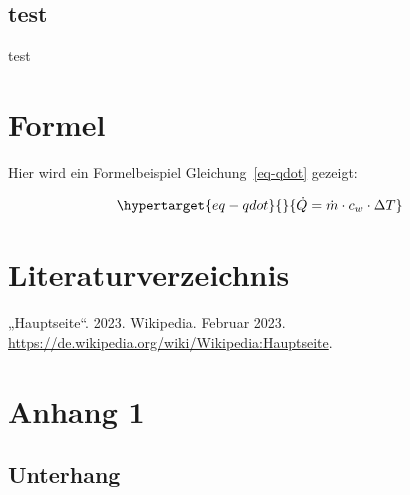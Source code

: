 \documentclass[
  11pt,
]{scrbook}
\newlength{\cslhangindent}
\newlength{\cslentryspacingunit} %
\newenvironment{CSLReferences}[2] %
 {%
  \setlength{\parindent}{0pt}
  \ifodd #1
  \let\oldpar\par
  \def\par{\hangindent=\cslhangindent\oldpar}
  \fi
  \setlength{\parskip}{#2\cslentryspacingunit}
 }%
 {}
\begin{document}
\hypertarget{test}{%
\section{test}\label{test}}

test

\hypertarget{formel}{%
\chapter{Formel}\label{formel}}

Hier wird ein Formelbeispiel Gleichung~\ref{eq-qdot} gezeigt:

\begin{equation}\protect\hypertarget{eq-qdot}{}{
\dot{Q} = \dot{m} \cdot c_w \cdot \Delta{T}
}\label{eq-qdot}\end{equation}

\hypertarget{literaturverzeichnis}{%
\chapter*{Literaturverzeichnis}\label{literaturverzeichnis}}

\hypertarget{refs}{}
\begin{CSLReferences}{1}{0}
\leavevmode{}%
{„Hauptseite``}. 2023. Wikipedia. Februar 2023.
\url{https://de.wikipedia.org/wiki/Wikipedia:Hauptseite}.

\end{CSLReferences}

\appendix
\renewcommand{\thechapter}{\Alph{chapter}}
\setcounter{chapter}{0}

\hypertarget{anhang-1}{%
\chapter{Anhang 1}\label{anhang-1}}

\setcounter{page}{1}
\renewcommand{\thepage}{\thechapter.\arabic{page}} %

\hypertarget{unterhang}{%
\section{Unterhang}\label{unterhang}}
\end{document}
